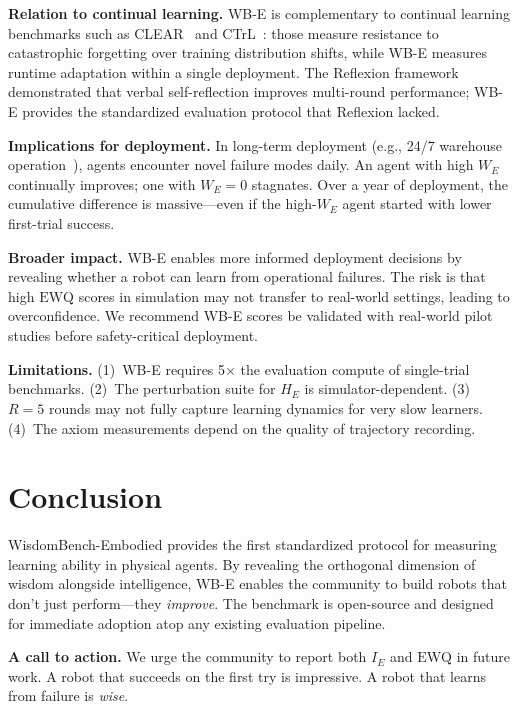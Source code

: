 \documentclass{article}
\newcommand{\EWQ}{\mathrm{EWQ}}
\begin{document}
\textbf{Relation to continual learning.}
WB-E is complementary to continual learning benchmarks such as CLEAR~\citep{lin2022clear} and CTrL~\citep{veniat2020ctrl}: those measure resistance to catastrophic forgetting over training distribution shifts, while WB-E measures runtime adaptation within a single deployment.
The Reflexion framework~\citep{shinn2023reflexion} demonstrated that verbal self-reflection improves multi-round performance; WB-E provides the standardized evaluation protocol that Reflexion lacked.

\textbf{Implications for deployment.}
In long-term deployment (e.g., 24/7 warehouse operation~\citep{brohan2023rt2}), agents encounter novel failure modes daily.
An agent with high $W_E$ continually improves; one with $W_E = 0$ stagnates.
Over a year of deployment, the cumulative difference is massive---even if the high-$W_E$ agent started with lower first-trial success.

\textbf{Broader impact.}
WB-E enables more informed deployment decisions by revealing whether a robot can learn from operational failures.  The risk is that high $\EWQ$ scores in simulation may not transfer to real-world settings, leading to overconfidence.  We recommend WB-E scores be validated with real-world pilot studies before safety-critical deployment.

\textbf{Limitations.}
(1)~WB-E requires 5$\times$ the evaluation compute of single-trial benchmarks.
(2)~The perturbation suite for $\hat{H}_E$ is simulator-dependent.
(3)~$R=5$ rounds may not fully capture learning dynamics for very slow learners.
(4)~The axiom measurements depend on the quality of trajectory recording.

\section{Conclusion}
\label{sec:conclusion}

WisdomBench-Embodied provides the first standardized protocol for measuring learning ability in physical agents.
By revealing the orthogonal dimension of wisdom alongside intelligence, WB-E enables the community to build robots that don't just perform---they \emph{improve}.
The benchmark is open-source and designed for immediate adoption atop any existing evaluation pipeline.

\textbf{A call to action.}
We urge the community to report both $I_E$ and $\EWQ$ in future work.
A robot that succeeds on the first try is impressive.
A robot that learns from failure is \emph{wise}.



\end{document}
